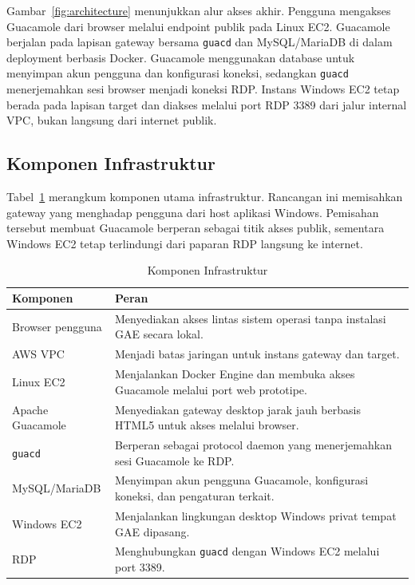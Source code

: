 \documentclass[conference]{IEEEtran}
\begin{document}
Gambar~\ref{fig:architecture} menunjukkan alur akses akhir. Pengguna mengakses Guacamole dari browser melalui endpoint publik pada Linux EC2. Guacamole berjalan pada lapisan gateway bersama \texttt{guacd} dan MySQL/MariaDB di dalam deployment berbasis Docker. Guacamole menggunakan database untuk menyimpan akun pengguna dan konfigurasi koneksi, sedangkan \texttt{guacd} menerjemahkan sesi browser menjadi koneksi RDP. Instans Windows EC2 tetap berada pada lapisan target dan diakses melalui port RDP 3389 dari jalur internal VPC, bukan langsung dari internet publik.

\subsection{Komponen Infrastruktur}

Tabel~\ref{tab:components} merangkum komponen utama infrastruktur. Rancangan ini memisahkan gateway yang menghadap pengguna dari host aplikasi Windows. Pemisahan tersebut membuat Guacamole berperan sebagai titik akses publik, sementara Windows EC2 tetap terlindungi dari paparan RDP langsung ke internet.

\begin{table}[!t]
\centering
\caption{Komponen Infrastruktur}
\label{tab:components}
\begin{tabularx}{\columnwidth}{p{2.2cm}X}
\toprule
\textbf{Komponen} & \textbf{Peran} \\
\midrule
Browser pengguna & Menyediakan akses lintas sistem operasi tanpa instalasi GAE secara lokal. \\
AWS VPC & Menjadi batas jaringan untuk instans gateway dan target. \\
Linux EC2 & Menjalankan Docker Engine dan membuka akses Guacamole melalui port web prototipe. \\
Apache Guacamole & Menyediakan gateway desktop jarak jauh berbasis HTML5 untuk akses melalui browser. \\
\texttt{guacd} & Berperan sebagai protocol daemon yang menerjemahkan sesi Guacamole ke RDP. \\
MySQL/MariaDB & Menyimpan akun pengguna Guacamole, konfigurasi koneksi, dan pengaturan terkait. \\
Windows EC2 & Menjalankan lingkungan desktop Windows privat tempat GAE dipasang. \\
RDP & Menghubungkan \texttt{guacd} dengan Windows EC2 melalui port 3389. \\
\bottomrule
\end{tabularx}
\end{table}
\end{document}
